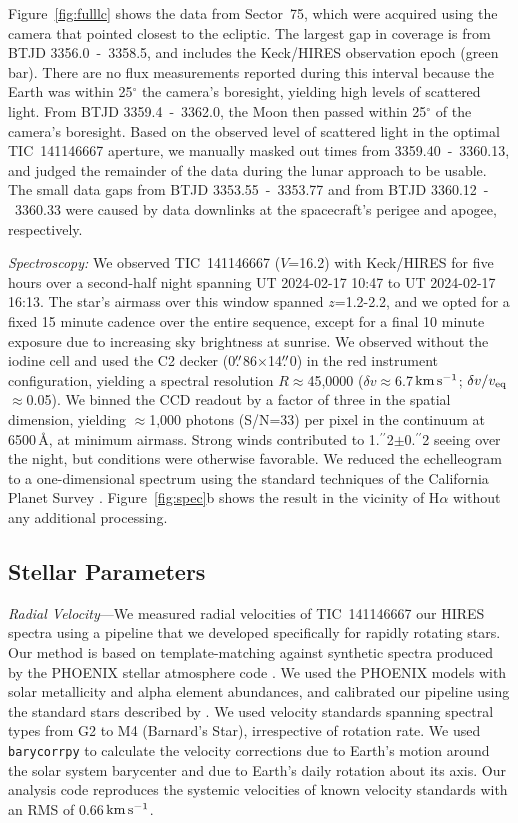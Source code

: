 \documentclass{nature3}
\newcommand{\farcs}{\mbox{\ensuremath{.\!\!^{\prime\prime}}}}%
\newcommand{\kms}{\ensuremath{\rm km\,s^{-1}}}
\begin{document}
\begin{methods}
Figure~\ref{fig:fulllc} shows the data from Sector~75, which were
acquired using the camera that pointed closest to the ecliptic.  The
largest gap in coverage is from BTJD 3356.0~-~3358.5, and includes
the Keck/HIRES observation epoch (green bar).   There are no flux
measurements reported during this interval because the Earth was
within 25$^\circ$ the camera's boresight, yielding high levels of
scattered light.  From BTJD 3359.4~-~3362.0, the Moon then passed
within 25$^\circ$ of the camera's boresight.  Based on the observed
level of scattered light in the optimal TIC~141146667 aperture, we
manually masked out times from 3359.40~-~3360.13, and judged the
remainder of the data during the lunar approach to be usable.  The
small data gaps from BTJD 3353.55~-~3353.77 and from BTJD
3360.12~-~3360.33 were caused by data downlinks at the spacecraft's
perigee and apogee, respectively.

{\it Spectroscopy:}
We observed TIC~141146667 ($V$=16.2) with Keck/HIRES for five hours over a
second-half night spanning UT 2024-02-17 10:47 to UT 2024-02-17
16:13.  The star's airmass over this window spanned $z$=1.2-2.2, and
we opted for a fixed 15 minute cadence over the entire sequence,
except for a final 10 minute exposure due to increasing sky
brightness at sunrise.  We observed without the iodine cell and used
the C2 decker (0$\farcs$86$\times$14$\farcs$0) in the red instrument
configuration, yielding a spectral resolution $R$$\approx$45{,}0000
($\delta v$$\approx$6.7\,\kms; $\delta v / v_{\rm
eq}$$\approx$0.05).  We binned the CCD readout by a factor of three
in the spatial dimension, yielding $\approx$1,000 photons (S/N=33)
per pixel in the continuum at 6500\,\AA, at minimum airmass.  Strong
winds contributed to 1\farcs2$\pm$0\farcs2 seeing over the night,
but conditions were otherwise favorable.  We reduced the
echelleogram to a one-dimensional spectrum using the standard
techniques of the California Planet Survey \cite{Howard2010}.
Figure~\ref{fig:spec}b shows the result in the vicinity of H$\alpha$
without any additional processing.


\subsection{Stellar Parameters}\phantom{+}
\label{subsec:stparams}

{\it Radial Velocity}---We measured radial velocities of TIC~141146667
our HIRES spectra using a pipeline that we developed specifically
for rapidly rotating stars.  Our method is based on template-matching
against synthetic spectra produced by the PHOENIX stellar atmosphere
code \cite{Husser2013}.  We used the PHOENIX models with solar
metallicity and alpha element abundances, and calibrated our pipeline
using the standard stars described by \cite{Chubak2012}.  We used
velocity standards spanning spectral types from G2 to M4 (Barnard's
Star), irrespective of rotation rate.  We used \texttt{barycorrpy}
\cite{Kanodia2018} to calculate the velocity corrections due to Earth's
motion around the solar system barycenter and due to Earth's daily
rotation about its axis.  Our analysis code reproduces the systemic
velocities of known velocity standards \cite{Chubak2012} with an RMS of
0.66\,\kms.


\end{methods}
\end{document}

